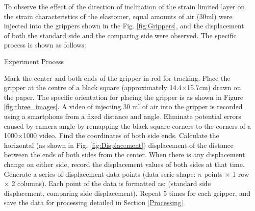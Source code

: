 \documentclass[conference]{IEEEtran}
\begin{document}
To observe the effect of the direction of inclination of the strain limited layer on the strain characteristics of the elastomer, equal amounts of air (30ml) were injected into the grippers shown in the Fig. \ref{fig:Grippers}, and the displacement of both the standard side and the comparing side were observed. The specific process is shown as follows:

\begin{algorithm}
\label{Algorithm}
	\caption{Experiment Process}\label{pseudo:ExperimentProcess}
	\begin{algorithmic}[1]
            \State Mark the center and both ends of the gripper in red for tracking.
            \State Place the gripper at the centre of a black square (approximately 14.4$\times$15.7cm) drawn on the paper. The specific orientation for placing the gripper is as shown in Figure \ref{fig:three_images}.
            \State A video of injecting 30 ml of air into the gripper is recorded using a smartphone from a fixed distance and angle.
            \State Eliminate potential errors caused by camera angle by remapping the black square corners to the corners of a 1000$\times$1000 video. 
            \State Find the coordinates of both side ends.
            \State Calculate the horizontal (as shown in Fig. \ref{fig:Displacement}) displacement of the distance between the ends of both sides from the center.
            \State When there is any displacement change on either side, record the displacement values of both sides at that time. Generate a series of displacement data points (data serie shape: $n$ points $\times$ 1 row $\times$ 2 columns). Each point of the data is formatted as: (standard side displacement, comparing side displacement).
            \State Repeat 5 times for each gripper, and save the data for processing detailed in Section \ref{Processing}.
	\end{algorithmic} 
\end{algorithm}
\end{document}
